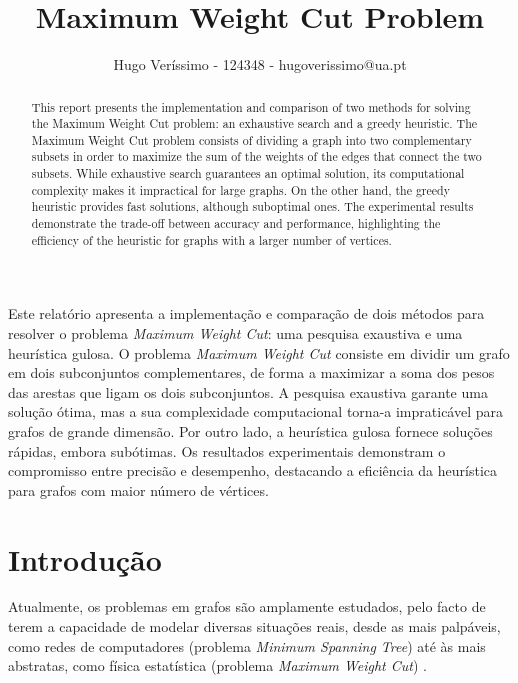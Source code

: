 \documentclass[mirror, portugues]{revdetua}
\begin{document}

\title{Maximum Weight Cut Problem}
\author{Hugo Veríssimo - 124348 - hugoverissimo@ua.pt}
\maketitle

\begin{abstract}
This report presents the implementation and comparison of two methods for solving the Maximum Weight Cut problem: an exhaustive search and a greedy heuristic. The Maximum Weight Cut problem consists of dividing a graph into two complementary subsets in order to maximize the sum of the weights of the edges that connect the two subsets. While exhaustive search guarantees an optimal solution, its computational complexity makes it impractical for large graphs. On the other hand, the greedy heuristic provides fast solutions, although suboptimal ones. The experimental results demonstrate the trade-off between accuracy and performance, highlighting the efficiency of the heuristic for graphs with a larger number of vertices.
\end{abstract}

\begin{resumo}
Este relatório apresenta a implementação e comparação de dois métodos para resolver o problema \textit{Maximum Weight Cut}: uma pesquisa exaustiva e uma heurística gulosa. O problema \textit{Maximum Weight Cut} consiste em dividir um grafo em dois subconjuntos complementares, de forma a maximizar a soma dos pesos das arestas que ligam os dois subconjuntos. A pesquisa exaustiva garante uma solução ótima, mas a sua complexidade computacional torna-a impraticável para grafos de grande dimensão. Por outro lado, a heurística gulosa fornece soluções rápidas, embora subótimas. Os resultados experimentais demonstram o compromisso entre precisão e desempenho, destacando a eficiência da heurística para grafos com maior número de vértices.
\end{resumo}

\section{Introdução}

Atualmente, os problemas em grafos são amplamente estudados, pelo facto de terem a capacidade de modelar diversas situações reais, desde as mais palpáveis, como redes de computadores (problema \textit{Minimum Spanning Tree}) até às mais abstratas, como física estatística (problema \textit{Maximum Weight Cut}) \cite{WANG10}.
\end{document}
